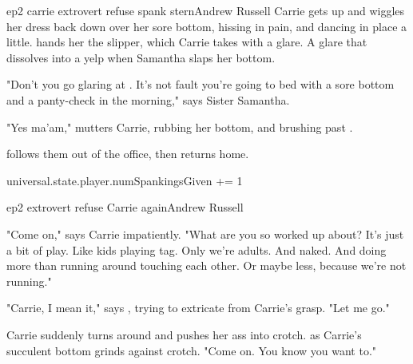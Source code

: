 \documentclass{book}
\begin{document}
\begin{childnode}{ep2 carrie extrovert refuse spank stern}{Andrew Russell}
    Carrie gets up and wiggles her dress back down over her sore bottom, hissing in pain, and dancing in place a little. \name{} hands her the slipper, which Carrie takes with a glare. A glare that dissolves into a yelp when Samantha slaps her bottom.

    "Don't you go glaring at \name{}. It's not \hisher{} fault you're going to bed with a sore bottom and a panty-check in the morning," says Sister Samantha.

    "Yes ma'am," mutters Carrie, rubbing her bottom, and brushing past \name{}.

    \name{} follows them out of the office, then returns home.


    \begin{code}

        universal.state.player.numSpankingsGiven += 1

    \end{code}




\end{childnode}

\begin{childnode}{ep2 extrovert refuse Carrie again}{Andrew Russell}

    "Come on," says Carrie impatiently. "What are you so worked up about? It's just a bit of play. Like kids playing tag. Only we're adults. And naked. And doing more than running around touching each other. Or maybe less, because we're not running."

    "Carrie, I mean it," says \name{}, trying to extricate \himselfherself{} from Carrie's grasp. "Let me go."

    Carrie suddenly turns around and pushes her ass into \names{} crotch. \names{}  as Carrie's succulent bottom 
    grinds against \hisher{} crotch. "Come on. You know you want to."

    



\end{childnode}
\end{document}
